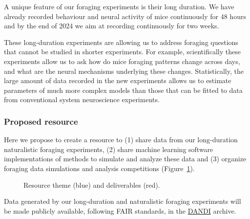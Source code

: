 A unique feature of our foraging experiments is their long duration. We have
already recorded behaviour and neural activity of mice continuously for 48 hours
and by the end of 2024 we aim at recording continuously for two weeks.

These long-duration experiments are allowing us to address foraging questions
that cannot be studied in shorter experiments. For example, scientifically
these experiments allow us to ask how do mice foraging patterns change across
days, and what are the neural mechanisms underlying these changes.
Statistically, the large amount of data recorded in the new experiments allows
us to estimate parameters of much more complex models than those that can be
fitted to data from conventional system neuroscience experiments.



\subsubsection*{Proposed resource}

Here we propose to create a resource to (1) share data from our long-duration
naturalistic foraging experiments, (2) share machine learning software
implementations of methods to simulate and analyze these data and (3) organize
foraging data simulations and analysis competitions (Figure~\ref{fig:resource}).

\begin{figure}
    \begin{center}
        
    \end{center}
    \caption{Resource theme (blue) and deliverables (red).}
    \label{fig:resource}
\end{figure}

Data generated by our long-duration and naturalistic foraging experiments will
be made publicly available, following FAIR standards, in the
\href{https://dandiarchive.org/}{DANDI} archive.

